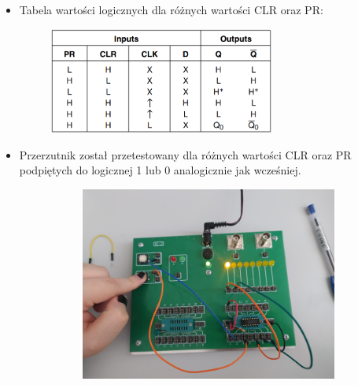 \begin{itemize}
    \item Tabela wartości logicznych dla różnych wartości CLR oraz PR:
        \begin{figure}[H]
            \centering
            \includegraphics[width=0.7\textwidth]{img/schemes/5_2_table.png}
            \label{D_jednozboczowy:tablica_prawdy}
        \end{figure}
    \item Przerzutnik został przetestowany dla różnych wartości CLR oraz PR podpiętych do logicznej 1 lub 0 analogicznie jak wcześniej.
        \begin{figure}[H]
            \centering
            \begin{subfigure}[H]{0.4\textwidth}
                \includegraphics[width=\textwidth]{img/5_2/1653500525143_scaled.png}
            \end{subfigure}
            \begin{subfigure}[H]{0.4\textwidth}

\end{subfigure}
\end{figure}
\end{itemize}
